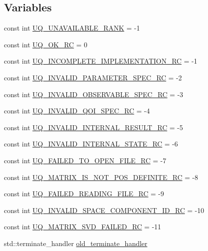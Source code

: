 \subsection*{Variables}
\begin{DoxyCompactItemize}
\item 
const int \hyperlink{namespace_q_u_e_s_o_a7d4679800a430ae8e473c1c7bc0bfb21}{U\-Q\-\_\-\-U\-N\-A\-V\-A\-I\-L\-A\-B\-L\-E\-\_\-\-R\-A\-N\-K} = -\/1
\item 
const int \hyperlink{namespace_q_u_e_s_o_a8e909502900aecf24cedba022ea84471}{U\-Q\-\_\-\-O\-K\-\_\-\-R\-C} = 0
\item 
const int \hyperlink{namespace_q_u_e_s_o_a5332d3ac9b246e40779ba01f19a3f0c7}{U\-Q\-\_\-\-I\-N\-C\-O\-M\-P\-L\-E\-T\-E\-\_\-\-I\-M\-P\-L\-E\-M\-E\-N\-T\-A\-T\-I\-O\-N\-\_\-\-R\-C} = -\/1
\item 
const int \hyperlink{namespace_q_u_e_s_o_a063c49e4743815cf95cde8425906b77e}{U\-Q\-\_\-\-I\-N\-V\-A\-L\-I\-D\-\_\-\-P\-A\-R\-A\-M\-E\-T\-E\-R\-\_\-\-S\-P\-E\-C\-\_\-\-R\-C} = -\/2
\item 
const int \hyperlink{namespace_q_u_e_s_o_a7184f2baf44df52d2c24409d9385c7b6}{U\-Q\-\_\-\-I\-N\-V\-A\-L\-I\-D\-\_\-\-O\-B\-S\-E\-R\-V\-A\-B\-L\-E\-\_\-\-S\-P\-E\-C\-\_\-\-R\-C} = -\/3
\item 
const int \hyperlink{namespace_q_u_e_s_o_a62fa6d4e5314c2054707ab73c97204ca}{U\-Q\-\_\-\-I\-N\-V\-A\-L\-I\-D\-\_\-\-Q\-O\-I\-\_\-\-S\-P\-E\-C\-\_\-\-R\-C} = -\/4
\item 
const int \hyperlink{namespace_q_u_e_s_o_afd6363699eae2710081ad1642a03131e}{U\-Q\-\_\-\-I\-N\-V\-A\-L\-I\-D\-\_\-\-I\-N\-T\-E\-R\-N\-A\-L\-\_\-\-R\-E\-S\-U\-L\-T\-\_\-\-R\-C} = -\/5
\item 
const int \hyperlink{namespace_q_u_e_s_o_ae093c8262be9961cc7297a84347c0c9e}{U\-Q\-\_\-\-I\-N\-V\-A\-L\-I\-D\-\_\-\-I\-N\-T\-E\-R\-N\-A\-L\-\_\-\-S\-T\-A\-T\-E\-\_\-\-R\-C} = -\/6
\item 
const int \hyperlink{namespace_q_u_e_s_o_aaab9e69ed66f6902eb9b42879a52fac1}{U\-Q\-\_\-\-F\-A\-I\-L\-E\-D\-\_\-\-T\-O\-\_\-\-O\-P\-E\-N\-\_\-\-F\-I\-L\-E\-\_\-\-R\-C} = -\/7
\item 
const int \hyperlink{namespace_q_u_e_s_o_a677863cd32092584175760250f39e8bb}{U\-Q\-\_\-\-M\-A\-T\-R\-I\-X\-\_\-\-I\-S\-\_\-\-N\-O\-T\-\_\-\-P\-O\-S\-\_\-\-D\-E\-F\-I\-N\-I\-T\-E\-\_\-\-R\-C} = -\/8
\item 
const int \hyperlink{namespace_q_u_e_s_o_ab2cce05a6208cb239ef640a4ba6e5327}{U\-Q\-\_\-\-F\-A\-I\-L\-E\-D\-\_\-\-R\-E\-A\-D\-I\-N\-G\-\_\-\-F\-I\-L\-E\-\_\-\-R\-C} = -\/9
\item 
const int \hyperlink{namespace_q_u_e_s_o_a0b5084868d81746fc7f2c0665b219812}{U\-Q\-\_\-\-I\-N\-V\-A\-L\-I\-D\-\_\-\-S\-P\-A\-C\-E\-\_\-\-C\-O\-M\-P\-O\-N\-E\-N\-T\-\_\-\-I\-D\-\_\-\-R\-C} = -\/10
\item 
const int \hyperlink{namespace_q_u_e_s_o_a7502f36b36f6ba457d2cf5004f7a7c69}{U\-Q\-\_\-\-M\-A\-T\-R\-I\-X\-\_\-\-S\-V\-D\-\_\-\-F\-A\-I\-L\-E\-D\-\_\-\-R\-C} = -\/11
\item 
std\-::terminate\-\_\-handler \hyperlink{namespace_q_u_e_s_o_ac54b755ffb94b8896563c43fec9a6a4c}{old\-\_\-terminate\-\_\-handler}
\end{DoxyCompactItemize}


